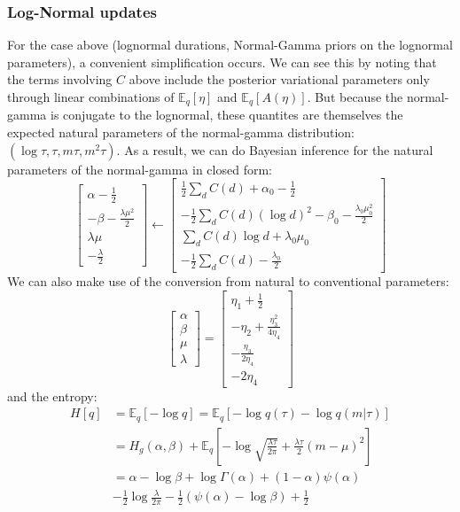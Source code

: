 \documentclass[11pt]{article}
\begin{document}
\subsubsection{Log-Normal updates}
For the case above (lognormal durations, Normal-Gamma priors on the lognormal parameters), a convenient simplification occurs. We can see this by noting that the terms involving $C$ above include the posterior variational parameters only through linear combinations of $\mathbb{E}_q[\eta]$ and $\mathbb{E}_q[A(\eta)]$. But because the normal-gamma is conjugate to the lognormal, these quantites are themselves the expected natural parameters of the normal-gamma distribution: $(\log \tau, \tau, m\tau, m^2\tau)$. As a result, we can do Bayesian inference for the natural parameters of the normal-gamma in closed form:
\begin{equation}
    \begin{bmatrix}
    \alpha - \frac{1}{2} \\
    -\beta - \frac{\lambda\mu^2}{2} \\
    \lambda\mu \\
    -\frac{\lambda}{2}
    \end{bmatrix}    
    \leftarrow
    \begin{bmatrix}
    \frac{1}{2}\sum_d C(d) + \alpha_0 - \frac{1}{2} \\
    -\frac{1}{2} \sum_d C(d) (\log d)^2 -\beta_0 - \frac{\lambda_0\mu_0^2}{2} \\
    \sum_d C(d) \log d + \lambda_0\mu_0 \\
    -\frac{1}{2}\sum_d C(d) - \frac{\lambda_0}{2}
    \end{bmatrix}    
\end{equation}
We can also make use of the conversion from natural to conventional parameters:
\begin{equation}
    \begin{bmatrix}
        \alpha \\
        \beta \\
        \mu \\
        \lambda 
    \end{bmatrix} =
    \begin{bmatrix}
        \eta_1 + \frac{1}{2} \\
        -\eta_2 + \frac{\eta_3^2}{4\eta_4} \\
        -\frac{\eta_3}{2\eta_4} \\
        -2\eta_4
    \end{bmatrix}
\end{equation}
and the entropy:
\begin{align}
    H[q] &= \mathbb{E}_q[-\log q] = \mathbb{E}_q[-\log q(\tau) - \log q(m|\tau)] \\
    &= H_g(\alpha, \beta) + \mathbb{E}_q\left[
    -\log \sqrt{\frac{\lambda\tau}{2\pi}} + 
    \frac{\lambda\tau}{2} (m - \mu)^2 
    \right] \\
    &= \alpha - \log \beta + \log \Gamma(\alpha) + (1 - \alpha) \psi(\alpha) \\
    & - \frac{1}{2} \log \frac{\lambda}{2\pi} - \frac{1}{2} \left(\psi(\alpha) - \log \beta\right)
    + \frac{1}{2} 
\end{align}
\end{document}
